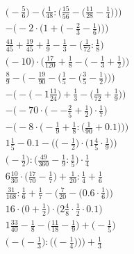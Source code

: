 \documentclass[8pt]{article}
\begin{document}
\begin{align}
\bigg(-\frac{5}{6}\bigg) - \bigg(\frac{1}{48} : \Big(\frac{15}{56} - \big(\frac{11}{28} - \frac{1}{4}\big)\Big)\bigg) \\
-\bigg(-2 \cdot \Big(1 + \big(-\frac{2}{3} - \frac{1}{6}\big)\Big)\bigg) \\
\frac{41}{45} + \frac{19}{45} + \frac{1}{9} - \frac{1}{3} - \big(\frac{1}{72} : \frac{1}{8}\big) \\
\Big(-10\Big) \cdot \Big(\frac{17}{120} + \frac{1}{8} - \big(-\frac{1}{3} + \frac{1}{2}\big)\Big) \\
\frac{8}{9} - \bigg(-\frac{19}{90} - \Big(\frac{1}{5} - \big(\frac{3}{5} - \frac{1}{2}\big)\Big)\bigg) \\
-\Big(-\big(-1\frac{11}{24}\big) + \frac{1}{3} - \big(\frac{1}{72} + \frac{1}{9}\big)\Big) \\
-\Big(-70 \cdot \big(--\frac{2}{5} + \frac{1}{2}\big) \cdot \frac{1}{7}\Big) \\
-\bigg(-8 \cdot \Big(-\frac{1}{9} + \frac{1}{8} : \big(\frac{1}{90} + 0.1\big)\Big)\bigg) \\
1\frac{1}{5} - 0.1 - \Big(\big(-\frac{1}{2}\big) \cdot \big(1\frac{4}{5} \cdot \frac{1}{9}\big)\Big) \\
\big(-\frac{1}{2}\big) : \big(\frac{49}{360} - \frac{1}{9} : \frac{1}{5}\big) \cdot \frac{1}{4} \\
6\frac{10}{30} \cdot \big(\frac{17}{70} - \frac{1}{7}\big) + \frac{1}{20} : \frac{1}{4} + \frac{1}{6} \\
\frac{31}{168} : \frac{1}{6} + \frac{1}{7} - \Big(\frac{7}{20} - \big(0.6 \cdot \frac{1}{6}\big)\Big) \\
16 \cdot \big(0 + \frac{1}{2}\big) \cdot \big(2\frac{4}{8} \cdot \frac{1}{2} \cdot 0.1\big) \\
1\frac{33}{40} - \frac{1}{8} - \big(\frac{11}{18} - \frac{1}{9}\big) + \big(-\frac{1}{5}\big) \\
\bigg(-\Big(-\frac{1}{3}\Big) : \Big(\big(-\frac{1}{4}\big)\Big)\bigg) + \frac{1}{3}
\end{align}
\end{document}
